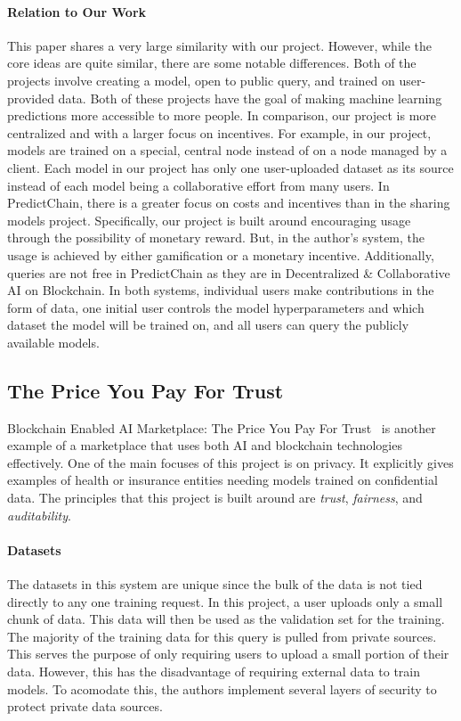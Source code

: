 \documentclass{article}
\begin{document}
    \paragraph{Relation to Our Work}
    This paper shares a very large similarity with our project.  However, while the core ideas are quite similar, there
    are some notable differences.  Both of the projects involve creating a model, open to public query, and trained on
    user-provided data.  Both of these projects have the goal of making machine learning predictions more accessible
    to more people.  In comparison, our project is more centralized and with a larger focus on incentives.  For
    example, in our project, models are trained on a special, central node instead of on a node managed by a client.
    Each model in our project has only one user-uploaded dataset as its source instead of each model being a collaborative
    effort from many users.  In PredictChain, there is a greater focus on costs and incentives than in the sharing models
    project.  Specifically, our project is built around encouraging usage through the possibility of monetary reward.
    But, in the author's system, the usage is achieved by either gamification or a monetary incentive.  Additionally,
    queries are not free in PredictChain as they are in Decentralized \& Collaborative AI on Blockchain.  In both systems,
    individual users make contributions in the form of data, one initial user controls the model hyperparameters and
    which dataset the model will be trained on, and all users can query the publicly available models.

    \subsection{The Price You Pay For Trust}

    Blockchain Enabled AI Marketplace: The Price You Pay For Trust~\cite{priceOfTrust} is another example of a marketplace
    that uses both AI and blockchain technologies effectively.  One of the main focuses of this project is on privacy.
    It explicitly gives examples of health or insurance entities needing models trained on confidential data.  The principles
    that this project is built around are \textit{trust}, \textit{fairness}, and \textit{auditability}.

    \paragraph{Datasets}
    The datasets in this system are unique since the bulk of the data is not tied directly to any one training request.
    In this project, a user uploads only a small chunk of data.  This data will then be used as the validation set for
    the training.  The majority of the training data for this query is pulled from private sources.  This serves the purpose
    of only requiring users to upload a small portion of their data.  However, this has the disadvantage of requiring
    external data to train models.  To acomodate this, the authors implement several layers of security to protect private
    data sources.
\end{document}
